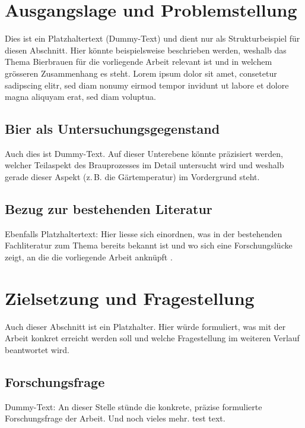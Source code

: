 \section{Ausgangslage und Problemstellung}
\label{sec:ausgangslage}

Dies ist ein Platzhaltertext (Dummy-Text) und dient nur als
Strukturbeispiel für diesen Abschnitt. Hier könnte beispielsweise
beschrieben werden, weshalb das Thema Bierbrauen für die vorliegende
Arbeit relevant ist und in welchem grösseren Zusammenhang es steht.
Lorem ipsum dolor sit amet, consetetur sadipscing elitr, sed diam
nonumy eirmod tempor invidunt ut labore et dolore magna aliquyam erat,
sed diam voluptua.

\subsection{Bier als Untersuchungsgegenstand}
\label{subsec:untersuchungsgegenstand}

Auch dies ist Dummy-Text. Auf dieser Unterebene könnte präzisiert
werden, welcher Teilaspekt des Brauprozesses im Detail untersucht wird
und weshalb gerade dieser Aspekt (z.\,B. die Gärtemperatur) im
Vordergrund steht.

\subsection{Bezug zur bestehenden Literatur}
\label{subsec:literaturbezug}

Ebenfalls Platzhaltertext: Hier liesse sich einordnen, was in der
bestehenden Fachliteratur zum Thema bereits bekannt ist und wo sich
eine Forschungslücke zeigt, an die die vorliegende Arbeit anknüpft
\parencite{bruecklmeier2022}.

\section{Zielsetzung und Fragestellung}
\label{sec:zielsetzung}

Auch dieser Abschnitt ist ein Platzhalter. Hier würde formuliert, was
mit der Arbeit konkret erreicht werden soll und welche Fragestellung
im weiteren Verlauf beantwortet wird.

\subsection{Forschungsfrage}
\label{subsec:forschungsfrage}

Dummy-Text: An dieser Stelle stünde die konkrete, präzise formulierte
Forschungsfrage der Arbeit. Und noch vieles mehr. test text.


